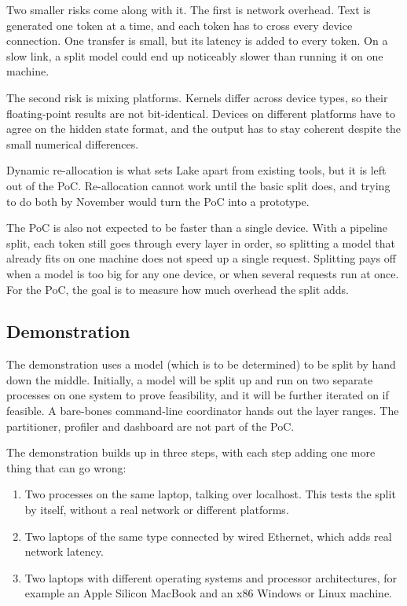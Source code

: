 \documentclass{article}
\begin{document}
Two smaller risks come along with it. The first is network overhead. Text is
generated one token at a time, and each token has to cross every device connection.
One transfer is small, but its latency is added to every token. On a slow link, a split
model could end up noticeably slower than running it on one machine. 

The second risk is mixing platforms. Kernels differ across device types, so
their floating-point results are not bit-identical. Devices on different
platforms have to agree on the hidden state format, and the output has to stay
coherent despite the small numerical differences.

Dynamic re-allocation is what sets Lake apart from existing tools, but it is
left out of the PoC. Re-allocation cannot work until the basic split does, and
trying to do both by November would turn the PoC into a prototype.

The PoC is also not expected to be faster than a single device. With a
pipeline split, each token still goes through every layer in order, so
splitting a model that already fits on one machine does not speed up a single
request. Splitting pays off when a model is too big for any one device, or
when several requests run at once. For the PoC, the goal is to measure how
much overhead the split adds.

\subsection{Demonstration}

The demonstration uses a model (which is to be determined) to be split by hand down the middle. Initially, a model will be split up and run on two separate processes on one system to prove feasibility, and it will be further iterated on if feasible. A bare-bones
command-line coordinator hands out the layer ranges. The partitioner, profiler
and dashboard are not part of the PoC.

The demonstration builds up in three steps, with each step adding one more
thing that can go wrong:

\begin{enumerate}
  \item Two processes on the same laptop, talking over localhost. This tests
    the split by itself, without a real network or different platforms.
  \item Two laptops of the same type connected by wired Ethernet, which adds
    real network latency.
  \item Two laptops with different operating systems and processor
    architectures, for example an Apple Silicon MacBook and an x86 Windows or
    Linux machine.
\end{enumerate}
\end{document}
